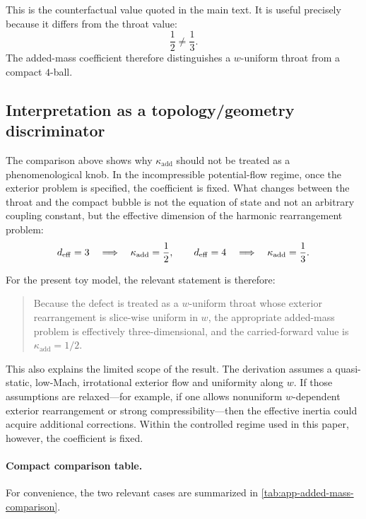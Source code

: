 \documentclass[11pt]{article}
\newcommand{\kadd}{\kappa_{\mathrm{add}}}
\begin{document}
This is the counterfactual value quoted in the main text. It is useful precisely because
it differs from the throat value:
\begin{equation}
\frac12 \neq \frac13.
\label{eq:app-half-not-third}
\end{equation}
The added-mass coefficient therefore distinguishes a \(w\)-uniform throat from a compact
\(4\)-ball.

\subsection{Interpretation as a topology/geometry discriminator}
\label{app:added-mass-interpretation}

The comparison above shows why \(\kadd\) should not be treated as a phenomenological knob.
In the incompressible potential-flow regime, once the exterior problem is specified, the
coefficient is fixed. What changes between the throat and the compact bubble is not the
equation of state and not an arbitrary coupling constant, but the effective dimension of
the harmonic rearrangement problem:
\begin{equation}
d_{\rm eff}=3
\quad\Longrightarrow\quad
\kadd=\frac12,
\qquad
d_{\rm eff}=4
\quad\Longrightarrow\quad
\kadd=\frac13.
\label{eq:app-deff-summary}
\end{equation}

For the present toy model, the relevant statement is therefore:
\begin{quote}
Because the defect is treated as a \(w\)-uniform throat whose exterior rearrangement is
slice-wise uniform in \(w\), the appropriate added-mass problem is effectively
three-dimensional, and the carried-forward value is \(\kadd=1/2\).
\end{quote}

This also explains the limited scope of the result. The derivation assumes a quasi-static,
low-Mach, irrotational exterior flow and uniformity along \(w\). If those assumptions are
relaxed---for example, if one allows nonuniform \(w\)-dependent exterior rearrangement or
strong compressibility---then the effective inertia could acquire additional corrections.
Within the controlled regime used in this paper, however, the coefficient is fixed.

\paragraph{Compact comparison table.}
For convenience, the two relevant cases are summarized in
\cref{tab:app-added-mass-comparison}.
\end{document}
